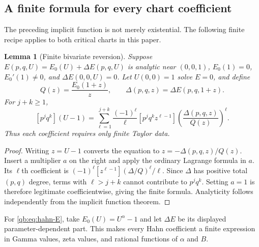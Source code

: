 \documentclass[11pt,a4paper]{article}
\newtheorem{lemma}[theorem]{Lemma}
\theoremstyle{definition}\newtheorem{definition}[theorem]{Definition}
\theoremstyle{remark}\newtheorem{remark}[theorem]{Remark}
\numberwithin{equation}{section}
\begin{document}
\subsection{A finite formula for every chart coefficient}

The preceding implicit function is not merely existential. The following
finite recipe applies to both critical charts in this paper.

\begin{lemma}[Finite bivariate reversion]\label{qb:lem:finite-chart}
Suppose $E(p,q,U)=E_0(U)+\Delta E(p,q,U)$ is analytic near $(0,0,1)$,
$E_0(1)=0$, $E_0'(1)\ne0$, and $\Delta E(0,0,U)=0$.
Let $U(0,0)=1$ solve $E=0$, and define
\[
 Q(z)=\frac{E_0(1+z)}z,\qquad
 \Delta(p,q,z)=\Delta E(p,q,1+z).
\]
For $j+k\ge1$,
\begin{equation}\label{qb:eq:finite-chart}
 [p^jq^k](U-1)=
 \sum_{\ell=1}^{j+k}\frac{(-1)^\ell}{\ell}
 [p^jq^kz^{\ell-1}]
 \left(\frac{\Delta(p,q,z)}{Q(z)}\right)^\ell.
\end{equation}
Thus each coefficient requires only finite Taylor data.
\end{lemma}
\begin{proof}
Writing $z=U-1$ converts the equation to $z=-\Delta(p,q,z)/Q(z)$.
Insert a multiplier $a$ on the right and apply the ordinary Lagrange
formula in $a$. Its $\ell$th coefficient is
$(-1)^\ell[ z^{\ell-1}](\Delta/Q)^\ell/\ell$.
Since $\Delta$ has positive total $(p,q)$ degree, terms with
$\ell>j+k$ cannot contribute to $p^jq^k$. Setting $a=1$ is therefore
legitimate coefficientwise, giving the finite formula. Analyticity follows
independently from the implicit function theorem.
\end{proof}

For \eqref{qb:eq:hahn-E}, take $E_0(U)=U^\alpha-1$ and let $\Delta E$
be its displayed parameter-dependent part. This makes every Hahn
coefficient a finite expression in Gamma values, zeta values, and rational
functions of $\alpha$ and $B$.
\end{document}
